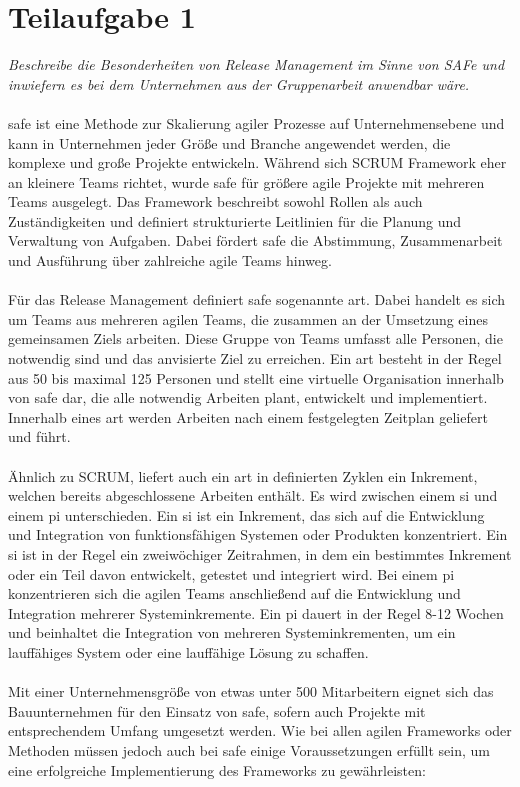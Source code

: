 \section{Teilaufgabe 1}

\textit{Beschreibe die Besonderheiten von Release Management im Sinne von SAFe und inwiefern es bei dem Unternehmen aus der Gruppenarbeit anwendbar wäre.}
\\
\\
\ac{safe} ist eine Methode zur Skalierung agiler Prozesse auf Unternehmensebene und kann in Unternehmen jeder Größe und Branche angewendet werden, die komplexe und große Projekte entwickeln. Während sich SCRUM Framework eher an kleinere Teams richtet, wurde \ac{safe} für größere agile Projekte mit mehreren Teams ausgelegt. Das Framework beschreibt sowohl Rollen als auch Zuständigkeiten und definiert strukturierte Leitlinien für die Planung und Verwaltung von Aufgaben. Dabei fördert \ac{safe} die Abstimmung, Zusammenarbeit und Ausführung über zahlreiche agile Teams hinweg. {\cite{ref01}}
\\
\\
Für das Release Management definiert \ac{safe} sogenannte \ac{art}. Dabei handelt es sich um Teams aus mehreren agilen Teams, die zusammen an der Umsetzung eines gemeinsamen Ziels arbeiten. Diese Gruppe von Teams umfasst alle Personen, die notwendig sind und das anvisierte Ziel zu erreichen. Ein \ac{art} besteht in der Regel aus 50 bis maximal 125 Personen und stellt eine virtuelle Organisation innerhalb von \ac{safe} dar, die alle notwendig Arbeiten plant, entwickelt und implementiert. Innerhalb eines \ac{art} werden Arbeiten nach einem festgelegten Zeitplan geliefert und führt. {\cite{ref02}}
\\
\\
Ähnlich zu SCRUM, liefert auch ein \ac{art} in definierten Zyklen ein Inkrement, welchen bereits abgeschlossene Arbeiten enthält. Es wird zwischen einem \ac{si} und einem \ac{pi} unterschieden. Ein \ac{si} ist ein Inkrement, das sich auf die Entwicklung und Integration von funktionsfähigen Systemen oder Produkten konzentriert. Ein \ac{si} ist in der Regel ein zweiwöchiger Zeitrahmen, in dem ein bestimmtes Inkrement oder ein Teil davon entwickelt, getestet und integriert wird. Bei einem \ac{pi} konzentrieren sich die agilen Teams anschließend auf die Entwicklung und Integration mehrerer Systeminkremente. Ein \ac{pi} dauert in der Regel 8-12 Wochen und beinhaltet die Integration von mehreren Systeminkrementen, um ein lauffähiges System oder eine lauffähige Lösung zu schaffen. {\cite{ref03}}
\\
\\
Mit einer Unternehmensgröße von etwas unter 500 Mitarbeitern eignet sich das Bauunternehmen für den Einsatz von \ac{safe}, sofern auch Projekte mit entsprechendem Umfang umgesetzt werden. Wie bei allen agilen Frameworks oder Methoden müssen jedoch auch bei \ac{safe} einige Voraussetzungen erfüllt sein, um eine erfolgreiche Implementierung des Frameworks zu gewährleisten:

